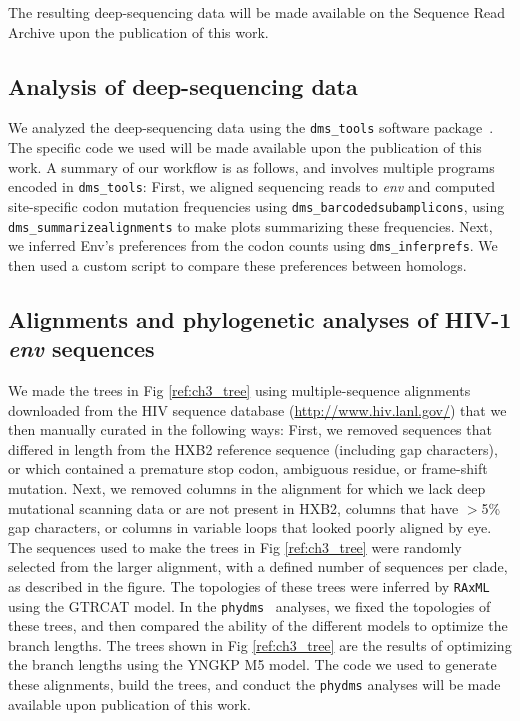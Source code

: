 \documentclass[9pt]{elife}
\begin{document}
The resulting deep-sequencing data will be made available on the Sequence Read Archive upon the publication of this work.

\subsection{Analysis of deep-sequencing data}

We analyzed the deep-sequencing data using the \texttt{dms\_tools} software package~\cite{bloom2015software}.
The specific code we used will be made available upon the publication of this work.
A summary of our workflow is as follows, and involves multiple programs encoded in \texttt{dms\_tools}:
First, we aligned sequencing reads to \textit{env} and computed site-specific codon mutation frequencies using \texttt{dms\_barcodedsubamplicons}, using \texttt{dms\_summarizealignments} to make plots summarizing these frequencies.
Next, we inferred Env's preferences from the codon counts using \texttt{dms\_inferprefs}.
We then used a custom script to compare these preferences between homologs.

\subsection{Alignments and phylogenetic analyses of HIV-1 {\it env} sequences}
We made the trees in Fig \ref{ref:ch3_tree} using multiple-sequence alignments downloaded from the HIV sequence database (\url{http://www.hiv.lanl.gov/}) that we then manually curated in the following ways:
First, we removed sequences that differed in length from the HXB2 reference sequence (including gap characters), or which contained a premature stop codon, ambiguous residue, or frame-shift mutation.
Next, we removed columns in the alignment for which we lack deep mutational scanning data or are not present in HXB2, columns that have $>$5\% gap characters, or columns in variable loops that looked poorly aligned by eye.
The sequences used to make the trees in Fig \ref{ref:ch3_tree} were randomly selected from the larger alignment, with a defined number of sequences per clade, as described in the figure.
The topologies of these trees were inferred by \texttt{RAxML} using the GTRCAT model.
In the \texttt{phydms}~\cite{hilton2017phydms} analyses, we fixed the topologies of these trees, and then compared the ability of the different models to optimize the branch lengths.
The trees shown in Fig \ref{ref:ch3_tree} are the results of optimizing the branch lengths using the YNGKP M5 model.
The code we used to generate these alignments, build the trees, and conduct the \texttt{phydms} analyses will be made available upon publication of this work.
\end{document}
